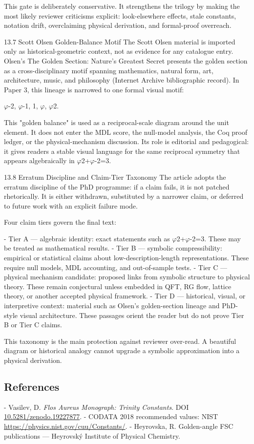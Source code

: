   This gate is deliberately conservative. It strengthens the trilogy by making the most
  likely reviewer criticisms explicit: look-elsewhere effects, stale constants, notation drift,
  overclaiming physical derivation, and formal-proof overreach.

  13.7 Scott Olsen Golden-Balance Motif
  The Scott Olsen material is imported only as historical-geometric context, not as
  evidence for any catalogue entry. Olsen's The Golden Section: Nature's Greatest Secret
  presents the golden section as a cross-disciplinary motif spanning mathematics, natural
  form, art, architecture, music, and philosophy (Internet Archive bibliographic record).
  In Paper 3, this lineage is narrowed to one formal visual motif:

  $\varphi$-2, $\varphi$-1, 1, $\varphi$, $\varphi$2.

  This "golden balance" is used as a reciprocal-scale diagram around the unit element. It
  does not enter the MDL score, the null-model analysis, the Coq proof ledger, or the
  physical-mechanism discussion. Its role is editorial and pedagogical: it gives readers a
  stable visual language for the same reciprocal symmetry that appears algebraically in
  $\varphi$2+$\varphi$-2=3.

  13.8 Erratum Discipline and Claim-Tier Taxonomy
  The article adopts the erratum discipline of the PhD programme: if a claim fails, it is not
  patched rhetorically. It is either withdrawn, substituted by a narrower claim, or
  deferred to future work with an explicit failure mode.

  Four claim tiers govern the final text:

  - Tier A --- algebraic identity: exact statements such as $\varphi$2+$\varphi$-2=3. These may be
  treated as mathematical results.
  - Tier B --- symbolic compressibility: empirical or statistical claims about
  low-description-length representations. These require null models, MDL accounting,
  and out-of-sample tests.
  - Tier C --- physical mechanism candidate: proposed links from symbolic structure to
  physical theory. These remain conjectural unless embedded in QFT, RG flow, lattice
  theory, or another accepted physical framework.
  - Tier D --- historical, visual, or interpretive context: material such as Olsen's
  golden-section lineage and PhD-style visual architecture. These passages orient the
  reader but do not prove Tier B or Tier C claims.

  This taxonomy is the main protection against reviewer over-read. A beautiful diagram
  or historical analogy cannot upgrade a symbolic approximation into a physical
  derivation.

\subsection{References}

- Vasilev, D. \textit{Flos Aureus Monograph: Trinity Constants}. DOI \href{https://zenodo.org/doi/10.5281/zenodo.19227877}{10.5281/zenodo.19227877}.
- CODATA 2018 recommended values: NIST \href{https://physics.nist.gov/cuu/Constants/}{https://physics.nist.gov/cuu/Constants/}.
- Heyrovska, R. Golden-angle FSC publications --- Heyrovský Institute of Physical Chemistry.

